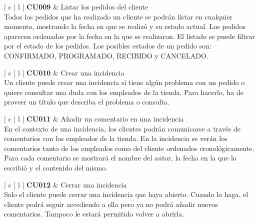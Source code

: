 \documentclass[11pt,spanish,listoffigures]{tfgetsinf}
\begin{document}
\begin{center}
\begin{tabular}{ | c | l | }
\hline
\textbf{ CU009 } & Listar los pedidos del cliente \\
\hline
{}
{
Todos los pedidos que ha realizado un cliente se podrán listar en cualquier momento, mostrando la fecha en que se realizó y su estado actual. Los pedidos aparecen ordenados por la fecha en la que se realizaron. El listado se puede filtrar por el estado de los pedidos. Los posibles estados de un pedido son: CONFIRMADO, PROGRAMADO, RECIBIDO y CANCELADO.
} \\
\hline
\end{tabular}
\end{center}

\begin{center}
\begin{tabular}{ | c | l | }
\hline
\textbf{ CU010 } & Crear una incidencia \\
\hline
{}
{
Un cliente puede crear una incidencia si tiene algún problema con un pedido o quiere consultar una duda con los empleados de la tienda. Para hacerlo, ha de proveer un título que describa el problema o consulta.
} \\
\hline
\end{tabular}
\end{center}

\begin{center}
\begin{tabular}{ | c | l | }
\hline
\textbf{ CU011 } & Añadir un comentario en una incidencia \\
\hline
{}
{
En el contexto de una incidencia, los clientes podrán comunicarse a través de comentarios con los empleados de la tienda. En la incidencia se verán los comentarios tanto de los empleados como del cliente ordenados cronológicamente. Para cada comentario se mostrará el nombre del autor, la fecha en la que lo escribió y el contenido del mismo.
} \\
\hline
\end{tabular}
\end{center}

\begin{center}
\begin{tabular}{ | c | l | }
\hline
\textbf{ CU012 } & Cerrar una incidencia \\
\hline
{}
{
Solo el cliente puede cerrar una incidencia que haya abierto. Cuando lo haga, el cliente podrá seguir accediendo a ella pero ya no podrá añadir nuevos comentarios. Tampoco le estará permitido volver a abrirla.
} \\
\hline
\end{tabular}
\end{center}
\end{document}
